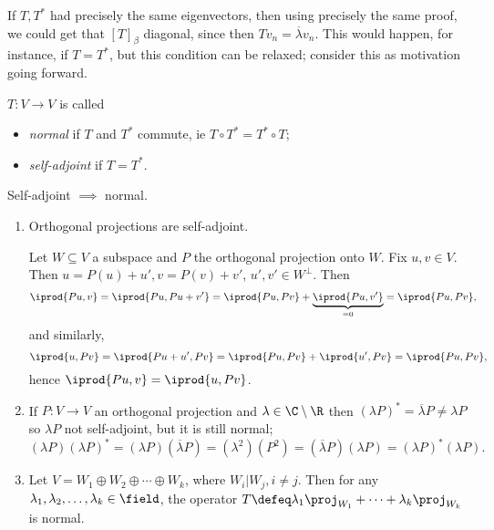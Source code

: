 \begin{remark}
    If $T, T^\ast$ had precisely the same eigenvectors, then using precisely the same proof, we could get that $[T]_\beta$ diagonal, since then $T v_n = \overline{\lambda} v_n$. This would happen, for instance, if $T = T^\ast$, but this condition can be relaxed; consider this as motivation going forward.
\end{remark}

\begin{definition}[Normality]
    $T : V \to V$ is called \begin{itemize}
        \item \emph{normal} if $T$ and $T^\ast$ commute, ie $T \circ T^\ast = T^\ast \circ T$;
        \item \emph{self-adjoint} if $T = T^\ast$.
    \end{itemize}
\end{definition}
\begin{remark}
    Self-adjoint $\implies$ normal.
\end{remark}

\begin{example}
    \begin{enumerate}[label=(\alph*)]
        \item Orthogonal projections are self-adjoint. 
        
        Let $W \subseteq V$ a subspace and $P$ the orthogonal projection onto $W$. Fix $u, v \in V$. Then $u = P(u) + u', v = P(v) + v'$, $u', v' \in W^\perp$. Then \begin{align*}
            \iprod{Pu, v} = \iprod{Pu, Pu + v'} &= \iprod{Pu, Pv} + \underbrace{\iprod{Pu, v'}}_{= 0}= \iprod{Pu, Pv},
        \end{align*}
        and similarly, \[\iprod{u, Pv} = \iprod{Pu + u', Pv} = \iprod{Pu, Pv} + \iprod{u', Pv} = \iprod{Pu, Pv},\]
        hence $\iprod{Pu, v} = \iprod{u, Pv}$.
        \item If $P : V \to V$ an orthogonal projection and $\lambda \in \C\setminus \R$ then $(\lambda P)^\ast = \overline{\lambda} P \neq \lambda P$ so $\lambda P$ not self-adjoint, but it is still normal; \[
        (\lambda P) (\lambda P)^\ast = (\lambda P)(\overline{\lambda} P) = (\lambda^2)(P^2) = (\overline{\lambda} P)(\lambda P) = (\lambda P)^\ast (\lambda P).
        \]
        \item Let $V = W_1 \oplus W_2 \oplus \cdots \oplus W_k$, where $W_i \vert W_j, i \neq j$. Then for any $\lambda_1, \lambda_2, \dots, \lambda_k \in \field$, the operator $T \defeq \lambda_1 \proj_{W_1} + \cdots + \lambda_k \proj_{W_k}$ is normal.
    \end{enumerate}
\end{example}

